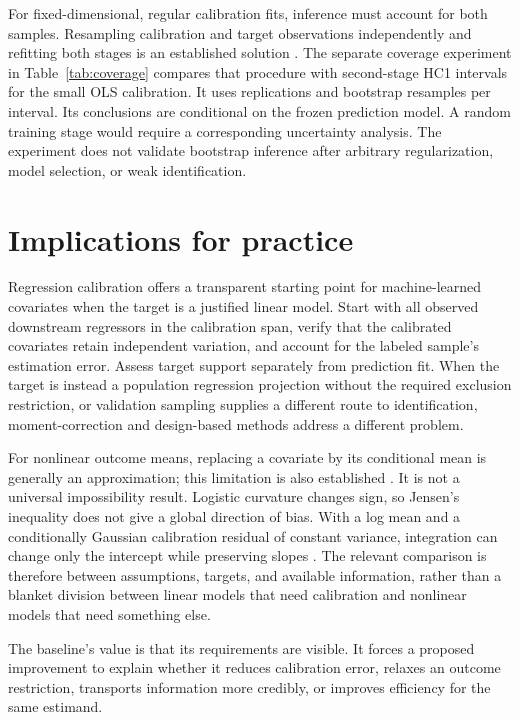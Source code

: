\documentclass[11pt]{article}
\begin{document}
For fixed-dimensional, regular calibration fits, inference must account for both samples. Resampling calibration and target observations independently and refitting both stages is an established solution \citep{boe2023}. The separate coverage experiment in Table~\ref{tab:coverage} compares that procedure with second-stage HC1 intervals for the small OLS calibration. It uses \InferenceReps{} replications and \BootstrapDraws{} bootstrap resamples per interval. Its conclusions are conditional on the frozen prediction model. A random training stage would require a corresponding uncertainty analysis. The experiment does not validate bootstrap inference after arbitrary regularization, model selection, or weak identification.

\section{Implications for practice}
Regression calibration offers a transparent starting point for machine-learned covariates when the target is a justified linear model. Start with all observed downstream regressors in the calibration span, verify that the calibrated covariates retain independent variation, and account for the labeled sample's estimation error. Assess target support separately from prediction fit. When the target is instead a population regression projection without the required exclusion restriction, or validation sampling supplies a different route to identification, moment-correction and design-based methods address a different problem.

For nonlinear outcome means, replacing a covariate by its conditional mean is generally an approximation; this limitation is also established \citep{carroll1990}. It is not a universal impossibility result. Logistic curvature changes sign, so Jensen's inequality does not give a global direction of bias. With a log mean and a conditionally Gaussian calibration residual of constant variance, integration can change only the intercept while preserving slopes \citep{wang2012}. The relevant comparison is therefore between assumptions, targets, and available information, rather than a blanket division between linear models that need calibration and nonlinear models that need something else.

The baseline's value is that its requirements are visible. It forces a proposed improvement to explain whether it reduces calibration error, relaxes an outcome restriction, transports information more credibly, or improves efficiency for the same estimand.
\end{document}
